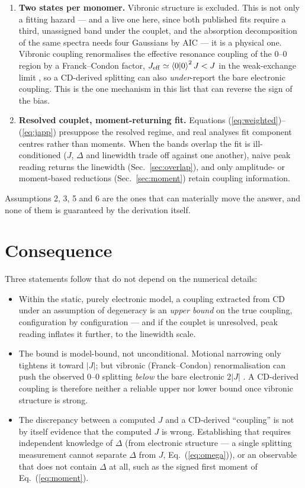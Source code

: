 \documentclass[11pt,a4paper]{article}
\begin{document}
\begin{enumerate}
\item \textbf{Two states per monomer.} Vibronic structure is excluded. This is
not only a fitting hazard --- and a live one here, since both published fits
require a third, unassigned band under the couplet, and the absorption
decomposition of the same spectra needs four Gaussians by AIC --- it is a
physical one. Vibronic coupling renormalises the
effective resonance coupling of the 0--0 region by a Franck--Condon factor,
$J_{\mathrm{eff}}\simeq\braket{0|0}^{2}J<J$ in the weak-exchange limit
\cite{simpson1957,hestand2018}, so a CD-derived splitting can also
\emph{under}-report the bare electronic coupling. This is the one mechanism in
this list that can reverse the sign of the bias.

\item \textbf{Resolved couplet, moment-returning fit.} Equations
(\ref{eq:weighted})--(\ref{eq:japp}) presuppose the resolved regime, and real
analyses fit component centres rather than moments. When the bands overlap the
fit is ill-conditioned ($J$, $\Delta$ and linewidth trade off against one
another), naive peak reading returns the linewidth
(Sec.~\ref{sec:overlap}), and only amplitude- or moment-based reductions
(Sec.~\ref{sec:moment}) retain coupling information.
\end{enumerate}

Assumptions 2, 3, 5 and 6 are the ones that can materially move the answer,
and none of them is guaranteed by the derivation itself.

\section{Consequence}

Three statements follow that do not depend on the numerical details:

\begin{itemize}
\item Within the static, purely electronic model, a coupling extracted from CD
under an assumption of degeneracy is an \emph{upper bound} on the true
coupling, configuration by configuration --- and if the couplet is unresolved,
peak reading inflates it further, to the linewidth scale.
\item The bound is model-bound, not unconditional. Motional narrowing only
tightens it toward $|J|$; but vibronic (Franck--Condon) renormalisation can
push the observed 0--0 splitting \emph{below} the bare electronic $2|J|$
\cite{simpson1957,hestand2018}. A CD-derived coupling is therefore neither a
reliable upper nor lower bound once vibronic structure is strong.
\item The discrepancy between a computed $J$ and a CD-derived ``coupling'' is
not by itself evidence that the computed $J$ is wrong. Establishing that
requires independent knowledge of $\Delta$ (from electronic structure --- a
single splitting measurement cannot separate $\Delta$ from $J$,
Eq.~(\ref{eq:omega})), or an observable that does not contain $\Delta$ at all,
such as the signed first moment of Eq.~(\ref{eq:moment}).
\end{itemize}
\end{document}

